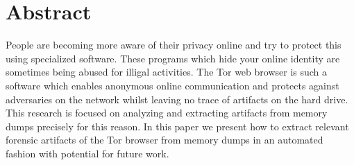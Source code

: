 \section*{Abstract}
People are becoming more aware of their privacy online and try to
protect this using specialized software. These programs which hide
your online identity are sometimes being abused for illigal
activities. The Tor web browser is such a software which enables
anonymous online communication and protects against adversaries on the
network whilst leaving no trace of artifacts on the hard drive. This
research is focused on analyzing and extracting artifacts from memory
dumps precisely for this reason. In this paper we present how to
extract relevant forensic artifacts of the Tor browser from memory
dumps in an automated fashion with potential for future work.
